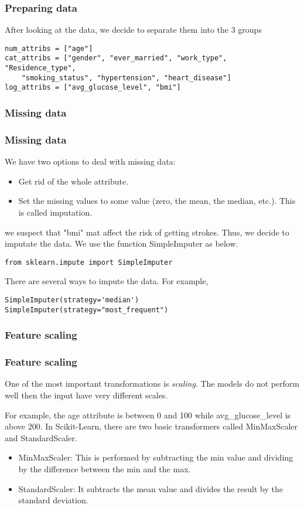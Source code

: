 \documentclass[10pt]{beamer}
\theoremstyle{definition}
\theoremstyle{remark}
\numberwithin{equation}{section}
\begin{document}
\begin{frame}[fragile]
	\frametitle{Preparing data}
After looking at the data, we decide to separate them into the $3$ groups 
		\begin{lstlisting}
num_attribs = ["age"]
cat_attribs = ["gender", "ever_married", "work_type", "Residence_type", 
	"smoking_status", "hypertension", "heart_disease"]
log_attribs = ["avg_glucose_level", "bmi"]
		\end{lstlisting}
\end{frame}

\subsubsection{Missing data}
\begin{frame}[fragile]
	\frametitle{Missing data }
We have two options to deal with missing data:
\begin{itemize}
	\item Get rid of the whole attribute.
	\item  Set the missing values to some value (zero, the mean, the median, etc.). This is called imputation.
\end{itemize}

we suspect that "bmi" mat affect the risk of getting strokes. Thus, we decide to imputate the data.
We use the function SimpleImputer as below.
	\begin{lstlisting}
from sklearn.impute import SimpleImputer 
	\end{lstlisting}
There are several ways to impute the data. For example,

\begin{lstlisting}
SimpleImputer(strategy='median')
SimpleImputer(strategy="most_frequent")
\end{lstlisting} 
\end{frame}
\subsubsection{Feature scaling}
\begin{frame}\frametitle{Feature scaling}
	One of the most important transformations is \textit{scaling}. The models do not perform well then the input have very different scales. 
	
	For example, the age attribute is between 0 and 100 while avg\_glucose\_level is above 200.
	In Scikit-Learn, there are two basic transformers called MinMaxScaler and StandardScaler.
	
	\begin{itemize}
		\item MinMaxScaler: This is performed by subtracting the min value and dividing by the difference between the min and the max.
		
		\item StandardScaler: It subtracts the mean value and divides the result by the standard deviation.
	\end{itemize}
\end{frame}
\end{document}
